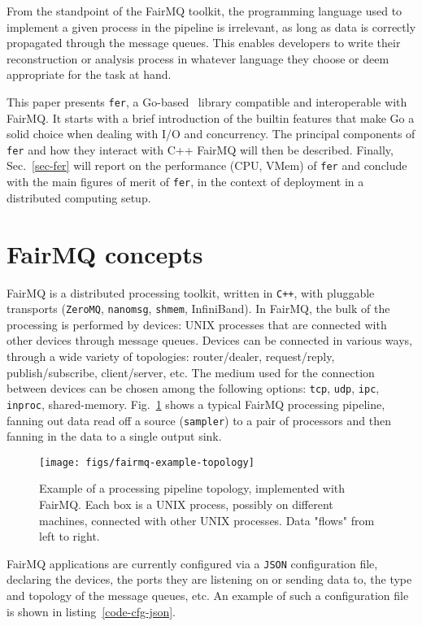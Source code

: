 \documentclass{webofc}
\begin{document}
From the standpoint of the FairMQ toolkit, the programming language used to implement a given process in the pipeline is irrelevant, as long as data is correctly propagated through the message queues. 
This enables developers to write their reconstruction or analysis process in whatever language they choose or deem appropriate for the task at hand.

This paper presents \texttt{fer}, a Go-based~\cite{ref-golang} library compatible and interoperable with FairMQ.
It starts with a brief introduction of the builtin features that make Go a solid choice when dealing with I/O and concurrency.
The principal components of \texttt{fer} and how they interact with C++ FairMQ will then be described.
Finally, Sec.~\ref{sec-fer} will report on the performance (CPU, VMem) of \texttt{fer} and conclude with the main figures of merit of \texttt{fer}, in the context of deployment in a distributed computing setup.

\section{FairMQ concepts}
\label{sec-fairmq-concepts}

FairMQ is a distributed processing toolkit, written in \texttt{C++}, with pluggable transports (\texttt{ZeroMQ}, \texttt{nanomsg}, \texttt{shmem}, InfiniBand).
In FairMQ, the bulk of the processing is performed by devices: UNIX processes that are connected with other devices through message queues.
Devices can be connected in various ways, through a wide variety of topologies: router/dealer, request/reply, publish/subscribe, client/server, etc.
The medium used for the connection between devices can be chosen among the following options: \texttt{tcp}, \texttt{udp}, \texttt{ipc}, \texttt{inproc}, shared-memory.
Fig.~\ref{fig-topology} shows a typical FairMQ processing pipeline, fanning out data read off a source (\texttt{sampler}) to a pair of processors and then fanning in the data to a single output sink.

\begin{figure}[h]
\centering
\texttt{[image: figs/fairmq-example-topology]}
\caption{Example of a processing pipeline topology, implemented with FairMQ. Each box is a UNIX process, possibly on different machines, connected with other UNIX processes. Data "flows" from left to right.}
\label{fig-topology}
\end{figure}

FairMQ applications are currently configured via a \texttt{JSON} configuration file, declaring the devices, the ports they are listening on or sending data to, the type and topology of the message queues, etc.
An example of such a configuration file is shown in listing~\ref{code-cfg-json}.
\end{document}

